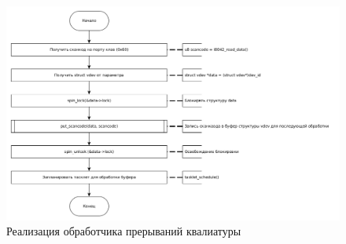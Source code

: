 \begin{figure}[H]
	\centering
	\includegraphics[width=1\linewidth]{src/img/irq_proceed}
	\caption{Реализация обработчика прерываний квалиатуры}
	\label{fig:irqproceed}
\end{figure}
